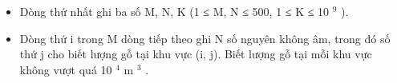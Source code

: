 \begin{itemize}
	\item Dòng thứ nhất ghi ba số M, N, K (1 ≤ M, N ≤ 500, 1 ≤ K ≤ 10 $^ 9 $ ).
	\item Dòng thứ i trong M dòng tiếp theo ghi N số nguyên không âm, trong đó số thứ j cho biết lượng gỗ tại khu vực (i, j). Biết lượng gỗ tại mỗi khu vực không vượt quá 10 $^ 4 $ m $^ 3 $ .
\end{itemize}

\